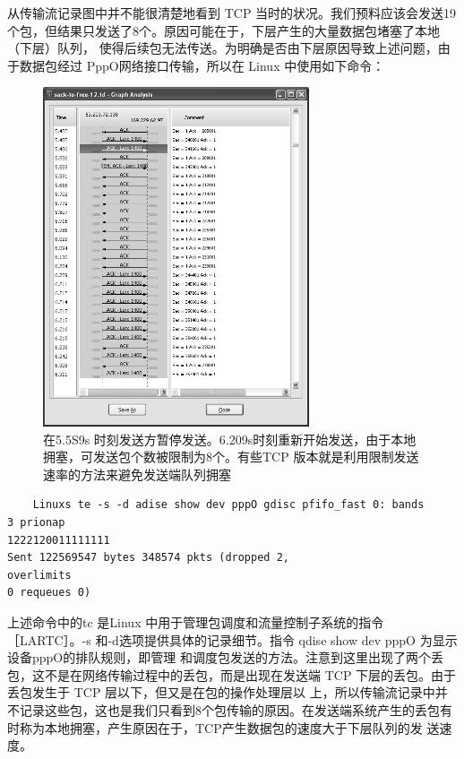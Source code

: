 从传输流记录图中并不能很清楚地看到 TCP 当时的状况。我们预料应该会发送19个包，但结果只发送了8个。原因可能在于，下层产生的大量数据包堵塞了本地（下层）队列，
使得后续包无法传送。为明确是否由下层原因导致上述问题，由于数据包经过 PppO网络接口传输，所以在 Linux 中使用如下命令：
\begin{figure}[!htb]
    \centering
	\includegraphics[width=0.7\textwidth]{imgs/16/16-7.png}
	\caption{在5.5S9s 时刻发送方暂停发送。6.209s时刻重新开始发送，由于本地拥塞，可发送包个数被限制为8个。有些TCP 版本就是利用限制发送速率的方法来避免发送端队列拥塞}
\end{figure}

\begin{verbatim}
    Linuxs te -s -d adise show dev pppO gdisc pfifo_fast 0: bands
3 prionap
1222120011111111
Sent 122569547 bytes 348574 pkts (dropped 2,
overlimits
0 requeues 0)
\end{verbatim}

上述命令中的tc 是Linux 中用于管理包调度和流量控制子系统的指令［LARTC］。-s 和-d选项提供具体的记录细节。指令 qdise show dev pppO 为显示设备pppO的排队规则，即管理
和调度包发送的方法。注意到这里出现了两个丢包，这不是在网络传输过程中的丢包，而是出现在发送端 TCP 下层的丢包。由于丢包发生于 TCP 层以下，但又是在包的操作处理层以
上，所以传输流记录中并不记录这些包，这也是我们只看到8个包传输的原因。在发送端系统产生的丢包有时称为本地拥塞，产生原因在于，TCP产生数据包的速度大于下层队列的发
送速度。

